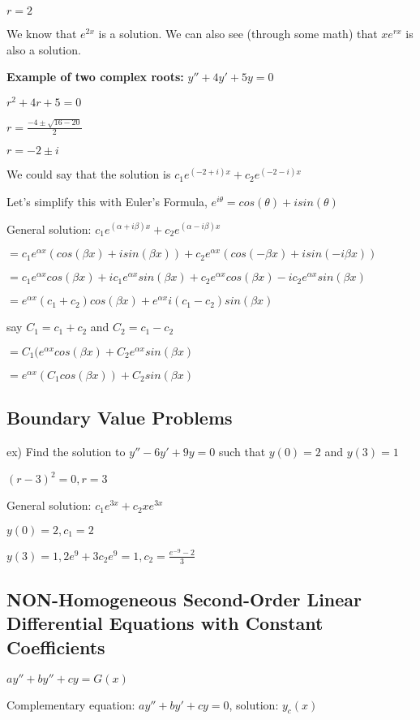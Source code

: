 \documentclass{article}
\begin{document}
$r=2$

We know that $e^{2x}$ is a solution. We can also see (through some math) that $xe^{rx}$ is also a solution.

\textbf{Example of two complex roots:} $y''+4y'+5y=0$

$r^2+4r+5=0$

$r=\frac{-4\pm \sqrt{16-20}}{2}$

$r=-2\pm i$

We could say that the solution is $c_1 e^{(-2+i)x}+c_2 e^{(-2-i)x}$

Let's simplify this with Euler's Formula, $e^{i\theta}=cos(\theta)+i sin(\theta)$

General solution: $c_1 e^{(\alpha+i\beta)x}+c_2e^{(\alpha-i\beta)x}$

$=c_1 e^{\alpha x}(cos(\beta x)+i sin(\beta x))+c_2 e^{\alpha x}(cos(-\beta x)+i sin(-i \beta x))$

$=c_1 e^{\alpha x}cos(\beta x)+i c_1 e^{\alpha x} sin(\beta x) + c_2 e^{\alpha x} cos(\beta x)-i c_2 e^{\alpha x} sin(\beta x)$

$=e^{\alpha x}(c_1+c_2) cos(\beta x)+e^{\alpha x} i (c_1-c_2) sin(\beta x)$

say $C_1 = c_1+c_2$ and $C_2 = c_1-c_2$

$=C_1(e^{\alpha x} cos(\beta x)+C_2 e^{\alpha x} sin(\beta x)$

$=e^{\alpha x}(C_1 cos(\beta x))+C_2 sin(\beta x)$


\subsection{Boundary Value Problems}

ex) Find the solution to $y''-6y'+9y=0$ such that $y(0)=2$ and $y(3)=1$

$(r-3)^2=0, r=3$

General solution: $c_1 e^{3x}+c_2 x e^{3x}$

$y(0)=2,c_1=2$

$y(3)=1, 2e^9+3c_2 e^9=1, c_2 = \frac{e^{-9}-2}{3}$

\subsection{NON-Homogeneous Second-Order Linear Differential Equations with Constant Coefficients}

$ay''+by''+cy=G(x)$

Complementary equation: $ay''+by'+cy=0$, solution: $y_c(x)$
\end{document}
